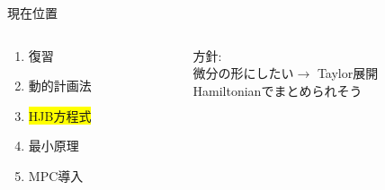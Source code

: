 \documentclass[twocolumn, dvipdfmx,12pt]{beamer}
\begin{document}
    \begin{frame}{現在位置}
        \footnotesize
        \begin{columns}
            \begin{column}{.35\textwidth}
                \begin{enumerate}
                    \item 復習
                    \item 動的計画法
                    \item \colorbox{yellow}{HJB方程式}
                    \item 最小原理
                    \item MPC導入
                \end{enumerate}
            \end{column}
    
            \begin{column}{.7\textwidth}
               
                \begin{screen}
                    
                    {\fontsize{7.5pt}{6pt}\selectfont
                    \begin{center}
                    \end{center}
                    }
                \end{screen}
                方針:\\
                \qquad 微分の形にしたい$\rightarrow$ Taylor展開\\
                \qquad Hamiltonianでまとめられそう\\
            \end{column}
        \end{columns}
    \end{frame}
\end{document}
